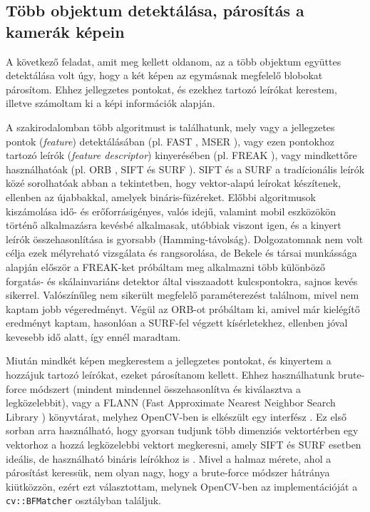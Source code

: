 \subsection{Több objektum detektálása, párosítás a kamerák képein}

A következő feladat, amit meg kellett oldanom, az a több objektum együttes detektálása volt úgy, hogy a két képen az egymásnak megfelelő blobokat párosítom. Ehhez jellegzetes pontokat, és ezekhez tartozó leírókat kerestem, illetve számoltam ki a képi információk alapján.

A szakirodalomban több algoritmust is találhatunk, mely vagy a jellegzetes pontok (\textit{feature}) detektálásában (pl. FAST \cite{FAST}, MSER \cite{MSER}), vagy ezen pontokhoz tartozó leírók (\textit{feature descriptor}) kinyerésében (pl. FREAK \cite{FREAK}), vagy mindkettőre használhatóak (pl. ORB \cite{ORB}, SIFT \cite{SIFT} és SURF \cite{SURF}). SIFT és a SURF a tradícionális leírók közé sorolhatóak abban a tekintetben, hogy vektor-alapú leírokat készítenek, ellenben az újabbakkal, amelyek bináris-füzéreket. Előbbi algoritmusok kiszámolása idő- és erőforrásigényes, valós idejű, valamint mobil eszközökön történő alkalmazásra kevésbé alkalmasak, utóbbiak viszont igen, és a kinyert leírók összehasonlítása is gyorsabb (Hamming-távolság). Dolgozatomnak nem volt célja ezek mélyreható vizsgálata és rangsorolása, de Bekele és társai munkássága \cite{feature-detection-comparison} alapján először a FREAK-ket próbáltam meg alkalmazni több különböző forgatás- és skálainvariáns detektor által visszaadott kulcspontokra, sajnos kevés sikerrel. Valószínűleg nem sikerült megfelelő paraméterezést találnom, mivel nem kaptam jobb végeredményt. Végül az ORB-ot próbáltam ki, amivel már kielégítő eredményt kaptam, hasonlóan a SURF-fel végzett kísérletekhez, ellenben jóval kevesebb idő alatt, így ennél maradtam.

Miután mindkét képen megkerestem a jellegzetes pontokat, és kinyertem a hozzájuk tartozó leírókat, ezeket párosítanom kellett. Ehhez használhatunk brute-force módszert (mindent mindennel összehasonlítva és kiválasztva a legközelebbit), vagy a FLANN (Fast Approximate Nearest Neighbor Search Library \cite{flann_pami_2014}) könyvtárat, melyhez OpenCV-ben is elkészült egy interfész \cite{opencv-flann}. Ez első sorban arra használható, hogy gyorsan tudjunk több dimenziós vektortérben egy vektorhoz a hozzá legközelebbi vektort megkeresni, amely SIFT és SURF esetben ideális, de használható bináris leírókhoz is \cite{flann-binary}. Mivel a halmaz mérete, ahol a párosítást keressük, nem olyan nagy, hogy a brute-force módszer hátránya kiütközzön, ezért ezt választottam, melynek OpenCV-ben az implementációját a \texttt{cv::BFMatcher} osztályban találjuk.

